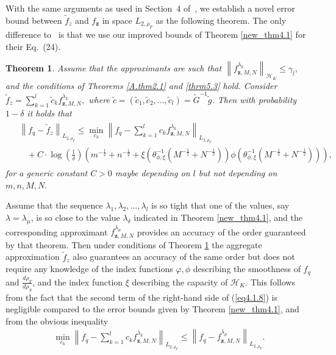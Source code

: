 \documentclass[USenglish]{article}
\newcommand{\norm}[1]{\left\lVert#1\right\rVert}
\newcommand{\hk}{{\mathcal{H}_K}}
\newtheorem{theorem}{Theorem}[section]
\begin{document}
With the same arguments as used in Section~4 of~\cite{gizewski2022regularization}, we establish a novel error bound between $\tilde{f}_z$ and $f_\mathbf{z}$ in space $L_{2,\rho_T}$ as the following theorem.
The only difference to~\cite[Section~4]{gizewski2022regularization} is that we use our improved bounds of Theorem \ref{new_thm4.1} for their Eq.~(24).
\begin{theorem}\label{thm4.1}
	Assume that the approximants are such
 that $\norm{f_{\mathbf{z},M,N}^{\lambda_k}  }_{\mathcal{H}_K} \leq \gamma_l,$
 and the conditions of Theorems \ref{A.thm2.1} and \ref{thrm5.3} hold. Consider $\tilde{f}_z = \sum_{k = 1}^l \tilde{c}_k f_{\mathbf{z},M,N}^{\lambda_k},$ where $\tilde{c} = (\tilde{c}_1,\tilde{c}_2,\ldots,\tilde{c}_l) = \tilde{G}^{-1} \tilde{g}$.
 Then with probability $1 -\delta$ it holds that%
\begin{align}
\label{eq4.1.8}
\begin{split}
&\norm{f_q - \tilde{f}_z}_{L_{2,\rho_T}} \leq \min_{c_k} \norm{f_q - \sum_{k = 1}^l c_k f_{\mathbf{z},M,N}^{\lambda_k}}_{L_{2,\rho_T}}\\
&~~~~+ C\cdot\log\!\left( \frac1\delta \right) \left(  m^{-\frac{1}{2}} + n^{-\frac{1}{2}} + \xi (\theta_{\phi,\xi}^{-1} (M^{-\frac{1}{2}}  + N^{-\frac{1}{2}}) ) \phi (\theta_{\phi,\xi}^{-1} (M^{-\frac{1}{2}}  + N^{-\frac{1}{2}} ) )\right),
\end{split}
\end{align}%
for a generic constant $C>0$ maybe depending on $l$ but not depending on $m,n,M,N.$
\end{theorem}
Assume that the sequence $\lambda_1,\lambda_2,\ldots,\lambda_l$ 
is so tight that one of the values, say $\lambda = \lambda_\mu$, is so close to the value $\lambda_\delta$ indicated in Theorem \ref{new_thm4.1}, and the corresponding approximant $f_{\mathbf{z},M,N}^{\lambda_\mu}$ provides an accuracy of the order guaranteed by that theorem. Then under conditions of Theorem \ref{thm4.1} the aggregate approximation $\tilde{f}_z$ also guarantees an accuracy of the same order but does not require any knowledge of the index functions $\varphi, \phi$ describing the smoothness of $f_q$ and $\frac{d\rho_T}{d\rho_S}$, and the index function $\xi$ describing the capacity of $\hk$. This follows from the fact that the second term of the right-hand side of (\ref{eq4.1.8}) is negligible compared to the error bounds given by Theorem \ref{new_thm4.1}, and from the obvious inequality
\begin{align*}
\min_{c_k} \norm{f_q - \sum_{k = 1}^l c_k f_{\mathbf{z},M,N}^{\lambda_k} }_{L_{2,\rho_T}} \leq \norm{f_q - f_{\mathbf{z},M,N}^{\lambda_\mu} }_{L_{2,\rho_T}}.
\end{align*}
\end{document}
